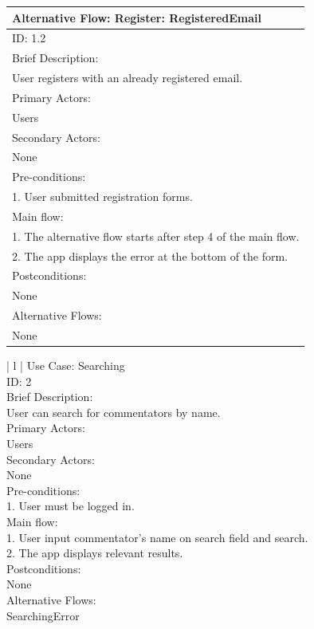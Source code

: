 \documentclass{article}
\begin{document}
\begin{flushleft}
\begin{longtable}[l]{| l |}
\hline
\end{longtable}
\begin{longtable}[l]{| l |}
\hline
Alternative Flow: Register: RegisteredEmail\\
\hline
ID: 1.2\\
\hline
Brief Description: \\
User registers with an already registered email.\\
\hline
Primary Actors:\\
Users\\
\hline
Secondary Actors:\\
None\\
\hline
Pre-conditions:\\
1. User submitted registration forms.\\
\hline
Main flow:\\
1. The alternative flow starts after step 4 of the main flow.\\
2. The app displays the error at the bottom of the form.\\
\hline
Postconditions:\\
None\\
\hline
Alternative Flows:\\
None\\
\hline
\end{longtable}
\begin{longtable}[l]{| l |}
\hline
{} {Use Case: Searching}\\
\hline
ID: 2\\
\hline
Brief Description: \\
User can search for commentators by name.\\
\hline
Primary Actors:\\
Users\\
\hline
Secondary Actors:\\
None\\
\hline
Pre-conditions:\\
1. User must be logged in.\\
\hline
Main flow:\\
1. User input commentator’s name on search field and search.\\
2. The app displays relevant results.\\
\hline
Postconditions:\\
None\\
\hline
Alternative Flows:\\
SearchingError\\
\hline
\end{longtable}

\end{flushleft}
\end{document}
